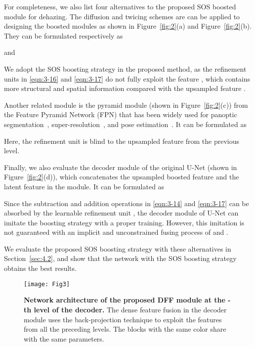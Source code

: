 \documentclass[10pt,twocolumn,letterpaper]{article}
\newcommand{\figref}[1]{Figure~\ref{fig:#1}}
\begin{document}
  For completeness, we also list four alternatives to the proposed SOS boosted module for dehazing.
The diffusion \cite{DiffusionBoosting} and twicing \cite{TwicingBoosting}  schemes are can be applied to designing the boosted modules as shown in \figref{2}(a) and \figref{2}(b).
They can be formulated respectively as
  
  and
  
We adopt the SOS boosting strategy in the proposed method, as the refinement units in \eqref{eqn:3-16} and \eqref{eqn:3-17} do not fully exploit the feature , which contains more structural and spatial information compared with the upsampled feature .


Another related module is the pyramid module (shown in \figref{2}(c)) from the Feature Pyramid Network (FPN) that has been widely used for panoptic segmentation~\cite{PFPN}, super-resolution~\cite{LapSRN}, and pose estimation~\cite{FPN_Pose}.
It can be formulated as
  
Here, the refinement unit is blind to the upsampled feature  from the previous level.


  Finally, we also evaluate the decoder module of the original U-Net (shown in \figref{2}(d)), which concatenates the upsampled boosted feature  and the latent feature  in the module.
It can be formulated as
  
Since the subtraction and addition operations in \eqref{eqn:3-14} and \eqref{eqn:3-17} can be absorbed by the learnable refinement unit ,
  the decoder module of U-Net can imitate the boosting strategy with a proper training.
However, this imitation is not guaranteed with an implicit and unconstrained fusing process of  and .
  
  We evaluate the proposed SOS boosting strategy with these alternatives in Section~\ref{sec:4.2}, and show that the network with the SOS boosting strategy obtains the best results.
  
\begin{figure*}
    \centering
    \texttt{[image: Fig3]}
    \caption{\textbf{Network architecture of the proposed DFF module at the -th level of the decoder.}
The dense feature fusion in the decoder module uses the back-projection technique to exploit the features from all the preceding levels.
The blocks with the same color share with the same parameters.}
  \label{fig:3}
  \vspace{-6mm}
  \end{figure*}
\end{document}
